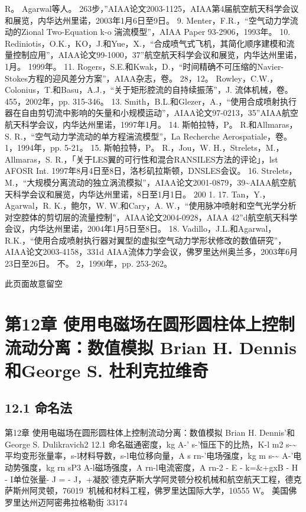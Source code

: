 \documentclass[UTF8,11pt,a4paper,openany,fontset=fandol]{ctexbook}
\begin{document}
R。 Agarwal等人。 263步，”AIAA论文2003-1125，AIAA第4届航空航天科学会议和展览，内华达州里诺，2003年1月6日至9日。 9. Menter，F.R.，“空气动力学流动的Zional Two-Equation k-o 湍流模型”，AIAA Paper 93-2906，1993年。 10. Rediniotis，O.K.，KO，J.和Yue，X.，“合成喷气式飞机，其简化顺序建模和流量控制应用”，AIAA论文99-1000，37”航空航天科学会议和展览，内华达州里诺，1月。 1999年。 11. Rogers，S.E.和Kwak，D.，“时间精确不可压缩的Navier-Stokes方程的迎风差分方案”，AIAA杂志，卷。 28，12。 Rowley，C.W.，Colonius，T.和Basu，A.J.，“关于矩形腔流的自持续振荡”，J. 流体机械，卷。 455，2002年，pp. 315-346。 13. Smith，B.L.和Glezer，A.，“使用合成喷射执行器在自由剪切流中影响的矢量和小规模运动”，AIAA论文97-0213，35”AIAA航空航天科学会议，内华达州里诺，1997年1月。 14. 斯帕拉特，P。 R.和Allmaras，S. R.，“空气动力学流动的单方程湍流模型”，La Recherche Aerospatiale，卷。 1，1994年，pp. 5-21。 15. 斯帕拉特，P。 R.，Jou，W. H.，Strelets，M.，Allmaras，S. R.，「关于LES翼的可行性和混合RANSILES方法的评论」，lst AFOSR Int. 1997年8月4日至8日，洛杉矶拉斯顿，DNSLES会议。 16. Strelets，M.，“大规模分离流动的独立涡流模拟”，AIAA论文2001-0879，39\textasciitilde{}AIAA航空航天科学会议和展览，内华达州里诺，8日至1月1日。 200 1. 17. Tan，Y.，Agarwal，R. K.，鲍尔，W. W.和Cary，A. W.，“使用脉冲喷射和空气光学分析对空腔体的剪切层的流量控制”，AIAA论文2004-0928，AIAA 42”d航空航天科学会议，内华达州里诺，2004年1月5日至8日。 18. Vadillo，J.L.和Agarwal，R.K.，“使用合成喷射执行器对翼型的虚拟空气动力学形状修改的数值研究”，AIAA论文2003-4158，331d AIAA流体力学会议，佛罗里达州奥兰多，2003年6月23日至26日。 不。 2，1990年，pp. 253-262。

此页面故意留空

\clearpage
\chapter{第12章 使用电磁场在圆形圆柱体上控制流动分离：数值模拟 Brian H. Dennis和George S. 杜利克拉维奇}
\section{12.1 命名法}
第12章 使用电磁场在圆形圆柱体上控制流动分离：数值模拟 Brian H. Dennis'和George S. Dulikravich2 12.1 命名磁通密度，kg A-' s-'恒压下的比热，K-l m2 s-\textasciitilde{}平均变形张量率，s-l材料导数，s-l电位移向量，A s rn-'电场强度，kg m s-\textasciitilde{} A-'电动势强度，kg rn sP3 A-l磁场强度，A rn-l电流密度，A rn-2 - E - k=\&+gxB - H - I单位张量- J = - J，+凝胶'德克萨斯大学阿灵顿分校机械和航空航天工程，德克萨斯州阿灵顿，76019 '机械和材料工程，佛罗里达国际大学，10555 W。 美国佛罗里达州迈阿密弗拉格勒街 33174
\end{document}

